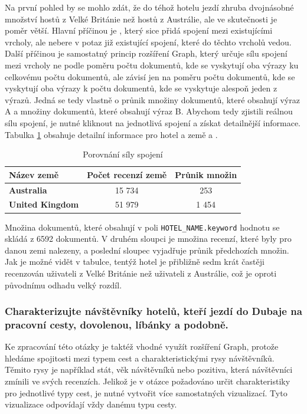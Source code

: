 \documentclass[czech,BP]{thesiskiv}
\begin{document}
 Na první pohled by se mohlo zdát, že do téhož hotelu jezdí zhruba dvojnásobné množství hostů z Velké Británie než hostů z Austrálie, ale ve skutečnosti je poměr větší. Hlavní příčinou je , který sice přidá spojení mezi existujícími vrcholy, ale nebere v potaz již existující spojení, které do těchto vrcholů vedou. Další příčinou je samostatný princip rozšíření Graph, který určuje sílu spojení mezi vrcholy ne podle poměru počtu dokumentů, kde se vyskytují oba výrazy ku celkovému počtu dokumentů, ale závisí jen na poměru počtu dokumentů, kde se vyskytují oba výrazy k počtu dokumentů, kde se vyskytuje alespoň jeden z výrazů. Jedná se tedy vlastně o průnik množiny dokumentů, které obsahují výraz A a množiny dokumentů, které obsahují výraz B. Abychom tedy zjistili reálnou sílu spojení, je nutné kliknout na jednotlivá spojení a získat detailnější informace. Tabulka \ref{sila spojeni} obsahuje detailní informace pro hotel  a země  a .
\begin{table}[htbp]
	\centering
	\begin{tabular}{l|c c}
		\hline
		\textbf{Název země}     & \multicolumn{1}{l}{\textbf{Počet recenzí země}} & \multicolumn{1}{l|}{\textbf{Průnik množin}} \\ \hline
		\textbf{Australia}      & 15 734                                           & 253                                         \\ 
		\textbf{United Kingdom} & 51 979                                           & 1 454                                       \\ \hline
	\end{tabular}
	\caption{Porovnání síly spojení}
	\label{sila spojeni}
\end{table}


Množina dokumentů, které obsahují v poli \texttt{HOTEL\_NAME.keyword} hodnotu  se skládá z 6592 dokumentů. V druhém sloupci je množina recenzí, které byly pro danou zemi nalezeny, a poslední sloupec vyjadřuje průnik předchozích množin. Jak je možné vidět v tabulce, tentýž hotel je přibližně sedm krát častěji recenzován uživateli z Velké Británie než uživateli z Austrálie, což je oproti původnímu odhadu velký rozdíl.

\subsubsection{Charakterizujte návštěvníky hotelů, kteří jezdí do Dubaje na pracovní cesty, dovolenou, líbánky a podobně.}
\label{subsub:Charakteristika návštěvníků}
Ke zpracování této otázky je taktéž vhodné využít rozšíření Graph, protože hledáme spojitosti mezi typem cest a charakteristickými rysy návštěvníků. Těmito rysy je například stát, věk návštěvníků nebo pozitiva, která návštěvníci zmínili ve svých recenzích. Jelikož je v otázce požadováno určit charakteristiky pro jednotlivé typy cest, je nutné vytvořit více samostatných vizualizací. Tyto vizualizace odpovídají vždy danému typu cesty.
\end{document}
